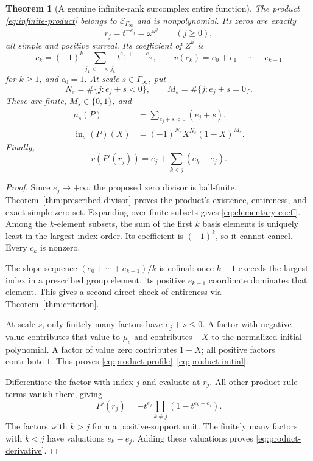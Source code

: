 \documentclass[11pt,letterpaper]{article}
\numberwithin{equation}{section}
\newtheorem{theorem}{Theorem}[section]
\theoremstyle{definition}
\theoremstyle{remark}
\newcommand{\ini}{\operatorname{in}}
\begin{document}
\begin{theorem}[A genuine infinite-rank surcomplex entire function]
\label{thm:infinite-example}
The product \eqref{eq:infinite-product} belongs to
$\mathcal E_{\Gamma_\infty}$ and is nonpolynomial. Its zeros are exactly
\begin{equation}\label{eq:surreal-zeros}
 r_j=t^{-e_j}=\omega^{\omega^j}\qquad(j\ge0),
\end{equation}
all simple and positive surreal. Its coefficient of $Z^k$ is
\begin{equation}\label{eq:elementary-coeff}
 c_k=(-1)^k\sum_{j_1<\cdots<j_k}t^{e_{j_1}+\cdots+e_{j_k}},
 \qquad
 v(c_k)=e_0+e_1+\cdots+e_{k-1}
\end{equation}
for $k\ge1$, and $c_0=1$.
At scale $s\in\Gamma_\infty$, put
\[
 N_s=\#\{j:e_j+s<0\},\qquad M_s=\#\{j:e_j+s=0\}.
\]
These are finite, $M_s\in\{0,1\}$, and
\begin{align}
 \mu_s(P)&=\sum_{e_j+s<0}(e_j+s),\label{eq:product-profile}\\
 \ini_s(P)(X)&=(-1)^{N_s}X^{N_s}(1-X)^{M_s}.\label{eq:product-initial}
\end{align}
Finally,
\begin{equation}\label{eq:product-derivative}
 v(P'(r_j))=e_j+\sum_{k<j}(e_k-e_j).
\end{equation}
\end{theorem}
\begin{proof}
Since $e_j\to+\infty$, the proposed zero divisor is ball-finite.
Theorem~\ref{thm:prescribed-divisor} proves the product's existence,
entireness, and exact simple zero set. Expanding over finite subsets gives
\eqref{eq:elementary-coeff}. Among the $k$-element subsets, the sum of the
first $k$ basis elements is uniquely least in the largest-index order.
Its coefficient is $(-1)^k$, so it cannot cancel. Every $c_k$ is nonzero.

The slope sequence $(e_0+\cdots+e_{k-1})/k$ is cofinal: once $k-1$ exceeds
the largest index in a prescribed group element, its positive $e_{k-1}$
coordinate dominates that element. This gives a second direct check of
entireness via Theorem~\ref{thm:criterion}.

At scale $s$, only finitely many factors have $e_j+s\le0$. A factor with
negative value contributes that value to $\mu_s$ and contributes $-X$ to the
normalized initial polynomial. A factor of value zero contributes $1-X$;
all positive factors contribute $1$. This proves
\eqref{eq:product-profile}--\eqref{eq:product-initial}.

Differentiate the factor with index $j$ and evaluate at $r_j$. All other
product-rule terms vanish there, giving
\[
 P'(r_j)=-t^{e_j}\prod_{k\ne j}(1-t^{e_k-e_j}).
\]
The factors with $k>j$ form a positive-support unit. The finitely many
factors with $k<j$ have valuations $e_k-e_j$. Adding these valuations proves
\eqref{eq:product-derivative}.
\end{proof}
\end{document}
